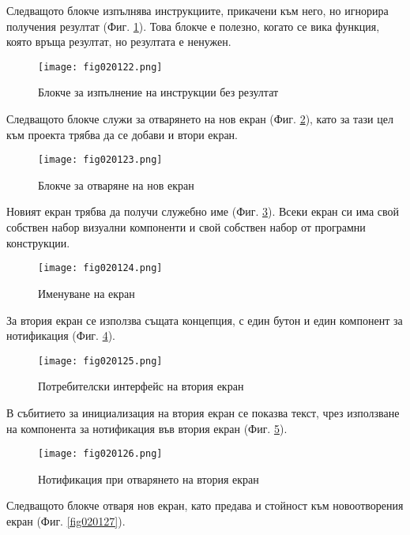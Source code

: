 Следващото блокче изпълнява инструкциите, прикачени към него, но игнорира получения резултат (Фиг. \ref{fig020122}). Това блокче е полезно, когато се вика функция, която връща резултат, но резултата е ненужен.

\begin{figure}[H]
  \centering
  \texttt{[image: fig020122.png]}
  \caption{Блокче за изпълнение на инструкции без резултат}
\label{fig020122}
\end{figure}

Следващото блокче служи за отварянето на нов екран (Фиг. \ref{fig020123}), като за тази цел към проекта трябва да се добави и втори екран.

\begin{figure}[H]
  \centering
  \texttt{[image: fig020123.png]}
  \caption{Блокче за отваряне на нов екран}
\label{fig020123}
\end{figure}

Новият екран трябва да получи служебно име (Фиг. \ref{fig020124}). Всеки екран си има свой собствен набор визуални компоненти и свой собствен набор от програмни конструкции. 

\begin{figure}[H]
  \centering
  \texttt{[image: fig020124.png]}
  \caption{Именуване на екран}
\label{fig020124}
\end{figure}

За втория екран се използва същата концепция, с един бутон и един компонент за нотификация (Фиг. \ref{fig020125}).

\begin{figure}[H]
  \centering
  \texttt{[image: fig020125.png]}
  \caption{Потребителски интерфейс на втория екран}
\label{fig020125}
\end{figure}

В събитието за инициализация на втория екран се показва текст, чрез използване на компонента за нотификация във втория екран (Фиг. \ref{fig020126}).

\begin{figure}[H]
  \centering
  \texttt{[image: fig020126.png]}
  \caption{Нотификация при отварянето на втория екран}
\label{fig020126}
\end{figure}

Следващото блокче отваря нов екран, като предава и стойност към новоотворения екран (Фиг. \ref{fig020127}).


